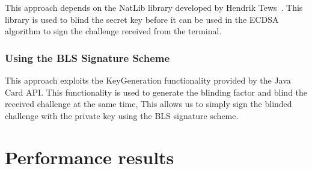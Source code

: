 This approach depends on the NatLib library developed by Hendrik
Tews~\cite{TewsJacobs09}. This library is used to blind the secret key before
it can be used in the ECDSA algorithm to sign the challenge received from the
terminal.

\subsubsection{Using the BLS Signature Scheme}

This approach exploits the KeyGeneration functionality provided by the Java Card
API. This functionality is used to generate the blinding factor and blind the
received challenge at the same time, This allows us to simply sign the blinded
challenge with the private key using the BLS signature scheme.

\section{Performance results}
